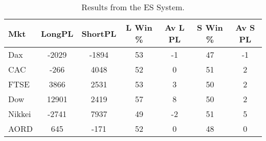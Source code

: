 \begin{table}[ht]
\centering
\caption[Results from the ES System]{Results from the ES System.} 
\label{tab:es_sys}
\begin{tabular}{lcccccc}
  \toprule Mkt & LongPL & ShortPL & L Win \% & Av L PL & S Win \% & Av S PL \\ 
  \midrule Dax & -2029 & -1894 & 53 & -1 & 47 & -1 \\ 
  CAC & -266 & 4048 & 52 & 0 & 51 & 2 \\ 
  FTSE & 3866 & 2531 & 53 & 3 & 50 & 2 \\ 
  Dow & 12901 & 2419 & 57 & 8 & 50 & 2 \\ 
  Nikkei & -2741 & 7937 & 49 & -2 & 51 & 5 \\ 
  AORD & 645 & -171 & 52 & 0 & 48 & 0 \\ 
   \bottomrule \end{tabular}
\end{table}
